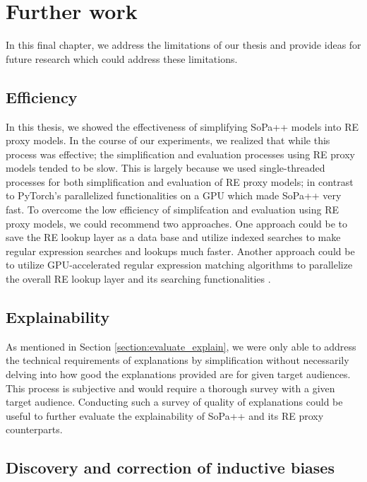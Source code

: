 \chapter{Further work}

In this final chapter, we address the limitations of our thesis and provide
ideas for future research which could address these limitations.

\section{Efficiency}

In this thesis, we showed the effectiveness of simplifying SoPa++ models into RE
proxy models. In the course of our experiments, we realized that while this
process was effective; the simplification and evaluation processes using RE
proxy models tended to be slow. This is largely because we used single-threaded
processes for both simplification and evaluation of RE proxy models; in contrast
to PyTorch's parallelized functionalities on a GPU which made SoPa++ very fast.
To overcome the low efficiency of simplifcation and evaluation using RE proxy
models, we could recommend two approaches. One approach could be to save the RE
lookup layer as a data base and utilize indexed searches to make regular
expression searches and lookups much faster. Another approach could be to
utilize GPU-accelerated regular expression matching algorithms to parallelize
the overall RE lookup layer and its searching functionalities
\citep{wang2011gregex,zu2012gpu,yu2013gpu}.

\section{Explainability}

As mentioned in Section \ref{section:evaluate_explain}, we were only able to
address the technical requirements of explanations by simplification without
necessarily delving into how good the explanations provided are for given target
audiences. This process is subjective and would require a thorough survey with a
given target audience. Conducting such a survey of quality of explanations could
be useful to further evaluate the explainability of SoPa++ and its RE proxy
counterparts.

\section{Discovery and correction of inductive biases}

